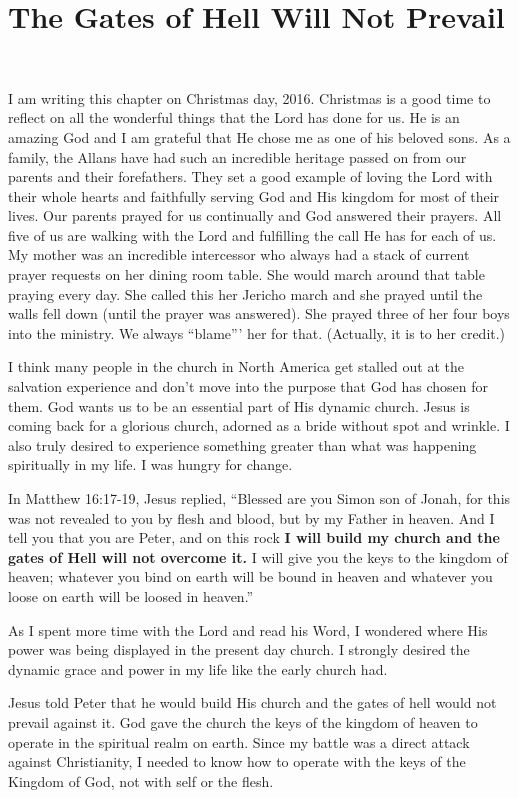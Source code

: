 \documentclass[twoside, 12pt]{book}
\begin{document}
\chapter{The Gates of Hell Will Not Prevail}
\

I am writing this chapter on Christmas day, 2016. Christmas is a good time to reflect on all the wonderful things that the Lord has done for us. He is an amazing God and I am grateful that He chose me as one of his beloved sons. As a family, the Allans have had such an incredible heritage passed on from our parents and their forefathers. They set a good example of loving the Lord with their whole hearts and faithfully serving God and His kingdom for most of their lives. Our parents prayed for us continually and God answered their prayers. All five of us are walking with the Lord and fulfilling the call He has for each of us. My mother was an incredible intercessor who always had a stack of current prayer requests on her dining room table. She would march around that table praying every day. She called this her Jericho march and she prayed until the walls fell down (until the prayer was answered). She prayed three of her four boys into the ministry. We always “blame”’ her for that. (Actually, it is to her credit.)

I think many people in the church in North America get stalled out at the salvation experience and don't move into the purpose that God has chosen for them. God wants us to be an essential part of His dynamic church. Jesus is coming back for a glorious church, adorned as a bride without spot and wrinkle. I also truly desired to experience something greater than what was happening spiritually in my life. I was hungry for change.

In Matthew 16:17-19, Jesus replied, “Blessed are you Simon son of Jonah, for this was not revealed to you by flesh and blood, but by my Father in heaven. And I tell you that you are Peter, and on this rock \textbf{I will build my church and the gates of Hell will not overcome it.} I will give you the keys to the kingdom of heaven; whatever you bind on earth will be bound in heaven and whatever you loose on earth will be loosed in heaven.”

As I spent more time with the Lord and read his Word, I wondered where His power was being displayed in the present day church. I strongly desired the dynamic grace and power in my life like the early church had. 

Jesus told Peter that he would build His church and the gates of hell would not prevail against it. God gave the church the keys of the kingdom of heaven to operate in the spiritual realm on earth. Since my battle was a direct attack against Christianity, I needed to know how to operate with the keys of the Kingdom of God, not with self or the flesh.
\end{document}
